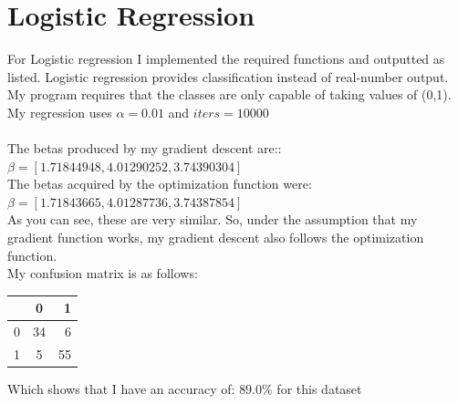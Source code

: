 \documentclass[11pt]{amsart}
\begin{document}
\section{Logistic Regression}
For Logistic regression I implemented the required functions and outputted as listed.  Logistic regression provides classification instead of real-number output.  My program requires that the classes are only capable of taking values of (0,1).  My regression uses $\alpha = 0.01$ and $iters = 10000$\\\\
The betas produced by my gradient descent are:: $\beta = [ 1.71844948,  4.01290252,  3.74390304]$\\
The betas acquired by the optimization function were: $\beta = [ 1.71843665,  4.01287736,  3.74387854]$\\
As you can see, these are very similar.  So, under the assumption that my gradient function works, my gradient descent also follows the optimization function.\\
My confusion matrix is as follows:\\
\begin{center}
\begin{tabular}{ l | c  r }			
   & 0 & 1 \\
   \hline
  0 & 34 & 6 \\
  1 & 5 & 55 \\
  \hline  
\end{tabular}
\end{center}
Which shows that I have an accuracy of: $89.0\%$ for this dataset 
\end{document}
